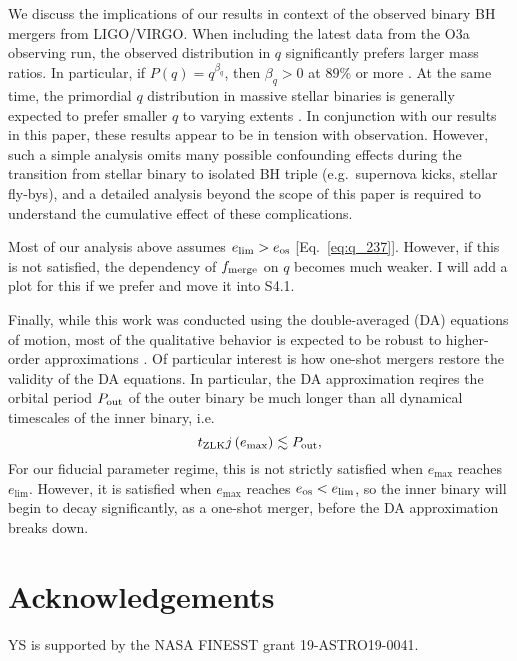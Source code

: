 \documentclass[
        fleqn,
        usenatbib,
    ]{mnras}
\newcommand*{\p}[1]{\left(#1\right)}
\begin{document}
We discuss the implications of our results in context of the observed binary BH
mergers from LIGO/VIRGO\@. When including the latest data from the O3a observing
run, the observed distribution in $q$ significantly prefers larger mass ratios.
In particular, if $P(q) = q^{\beta_q}$, then $\beta_q > 0$ at $89\%$ or more
\citep{LIGOO3a}. At the same time, the primordial $q$ distribution in massive
stellar binaries is generally expected to prefer smaller $q$ to varying extents
\citep[e.g.][]{sana2012binary, moe2017mind}. In conjunction with our results
in this paper, these results appear to be in tension with observation. However,
such a simple analysis omits many possible confounding effects during the
transition from stellar binary to isolated BH triple (e.g.\ supernova kicks,
stellar fly-bys), and a detailed analysis beyond the scope of this paper is
required to understand the cumulative effect of these complications.

Most of our analysis above assumes $e_{\lim} > e_{\rm os}$
[Eq.~\eqref{eq:q_237}]. However, if this is not satisfied, the dependency of
$f_{\rm merge}$ on $q$ becomes much weaker. \textcolor{Corr}{I will add a plot
for this if we prefer and move it into S4.1}.

Finally, while this work was conducted using the double-averaged (DA) equations
of motion, most of the qualitative behavior is expected to be robust to
higher-order approximations \citep[e.g.][]{LL19}. Of particular interest is how
one-shot mergers restore the validity of the DA equations. In particular, the DA
approximation reqires the orbital period $P_{\rm out}$ of the outer binary be
much longer than all dynamical timescales of the inner binary, i.e.
\begin{equation}
    t_{\rm ZLK}j\p{e_{\max}} \lesssim P_{\rm out},
\end{equation}
For our fiducial parameter regime, this is not strictly satisfied when
$e_{\max}$ reaches $e_{\lim}$. However, it is satisfied when $e_{\max}$ reaches
$e_{\rm os} < e_{\lim}$, so the inner binary will begin to decay significantly,
as a one-shot merger, before the DA approximation breaks down.

\section{Acknowledgements}\label{s:ack}

YS is supported by the NASA FINESST grant 19-ASTRO19-0041.%



\end{document}
